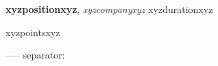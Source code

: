 \textbf{xyzpositionxyz}, \textit{xyzcompanyxyz} \hfill xyzdurationxyz
\begin{itemize}[leftmargin=1.5em,itemsep=2pt,topsep=3pt]
xyzpointsxyz
\end{itemize}
-----
separator: \vspace{8pt}
